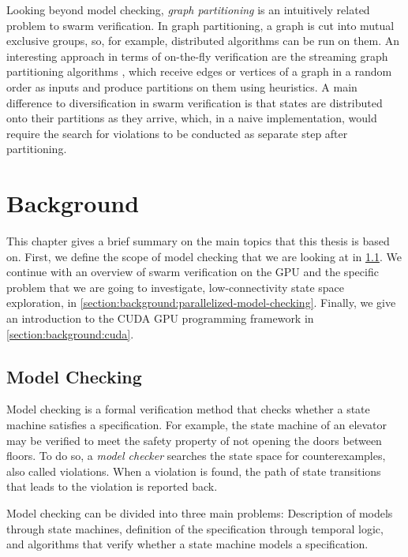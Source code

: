\documentclass[
fancyheadings, %
%
%
]{stsreprt}
\begin{document}
Looking beyond model checking, \emph{graph partitioning} is an intuitively related problem to swarm verification.
In graph partitioning, a graph is cut into mutual exclusive groups, so, for example, distributed algorithms can be run on them.
An interesting approach in terms of on-the-fly verification are the streaming graph partitioning algorithms \cite{Stanton2012}, which receive edges or vertices of a graph in a random order as inputs and produce partitions on them using heuristics.
A main difference to diversification in swarm verification is that states are distributed onto their partitions as they arrive, which, in a naive implementation, would require the search for violations to be conducted as separate step after partitioning.

\chapter{Background}
\label{chapter:background}

This chapter gives a brief summary on the main topics that this thesis is based on.
First, we define the scope of model checking that we are looking at in \cref{section:background:model-checking}.
We continue with an overview of swarm verification on the GPU and the specific problem that we are going to investigate, low-connectivity state space exploration, in \cref{section:background:parallelized-model-checking}.
Finally, we give an introduction to the CUDA GPU programming framework in \cref{section:background:cuda}.

\section{Model Checking}
\label{section:background:model-checking}

Model checking is a formal verification method that checks whether a state machine satisfies a specification.
For example, the state machine of an elevator may be verified to meet the safety property of not opening the doors between floors.
To do so, a \emph{model checker} searches the state space for counterexamples, also called violations.
When a violation is found, the path of state transitions that leads to the violation is reported back.

Model checking can be divided into three main problems:
Description of models through state machines, definition of the specification through temporal logic, and algorithms that verify whether a state machine models a specification.
\end{document}
